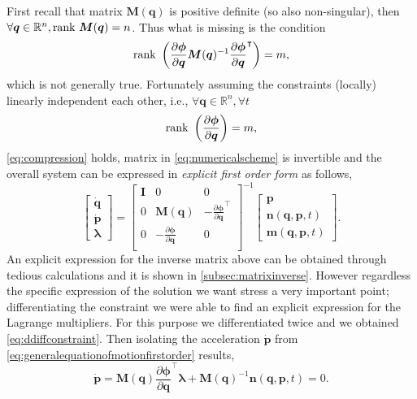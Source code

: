 First recall that matrix $\bm{M}(\bm{q})$ is positive definite
(so also non-singular), then $\forall\bm{q}\in\mathbb{R}^{n}, \mathrm{rank}~\bm{M}(\bm{q}) = n$.
Thus what is missing is the condition
\begin{equation}
	\label{eq:compression}
	\mathrm{rank}~\left( \frac{\partial\bm{\phi}}{\partial\bm{q}}
	\bm{M}(\bm{q})^{-1}\frac{\partial\bm{\phi}}{\partial\bm{q}}^{\intercal}\right) = m,
\end{equation}
which is not generally true. Fortunately assuming the constraints
(locally) linearly independent each other, i.e., $\forall\bm{q}\in\mathbb{R}^{n},\forall t$
\begin{equation}
	\label{eq:independentcondition}
	\mathrm{rank}~\left(\frac{\partial\bm{\phi}}{\partial\bm{q}}\right) = m, 
\end{equation}
\cref{eq:compression} holds, matrix in \cref{eq:numericalscheme}
is invertible and the overall system can be expressed in \emph{explicit first order form} as follows,
\begin{equation*}
	\begin{bmatrix}
		\dot{\bm{q}}\\
		\dot{\bm{p}}\\
		\bm{\lambda}
	\end{bmatrix}
	= 
	\begin{bmatrix}
		\bm{I} 	&	0		&	0 \\
		0	& 	\bm{M}(\bm{q}) 	&	-\frac{\partial\bm{\phi}}{\partial\bm{q}}^{\intercal} \\
		0 	& -\frac{\partial\bm{\phi}}{\partial\bm{q}} & 0\\
	\end{bmatrix}^{-1}
	\begin{bmatrix}
		\bm{p} \\
		\bm{n}(\bm{q},\bm{p},t) \\
		\bm{m}(\bm{q},\bm{p},t)
	\end{bmatrix}.
\end{equation*}
An explicit expression for the inverse matrix above can be obtained
through tedious calculations and it is shown in \cref{subsec:matrixinverse}.
However regardless the specific expression of the solution we want stress
a very important point; differentiating the constraint we were able to
find an explicit expression for the Lagrange multipliers.
For this purpose we differentiated twice and we obtained \cref{eq:ddiffconstraint}.
Then isolating the acceleration $\bm{\dot{p}}$ from \cref{eq:generalequationofmotionfirstorder} results,
\begin{equation}
	\label{eq:genvelo}
	\dot{\bm{p}} = \bm{M}(\bm{q})
	\frac{\partial\bm{\phi}}{\partial\bm{q}}^{\intercal}\bm{\lambda}
	+\bm{M}(\bm{q})^{-1}\bm{n}(\bm{q},\bm{p},t) = 0.	
\end{equation}
